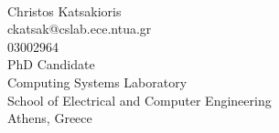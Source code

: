 \begin{titlepage}
		\HRule \\[2cm]

		\vspace{0.5cm}

	 	\Large
		Christos Katsakioris\\
		ckatsak@cslab.ece.ntua.gr\\
		03002964\\
		\vspace{0.25cm}
		\large
		PhD Candidate\\
		Computing Systems Laboratory\\
		School of Electrical and Computer Engineering\\

		\vspace{3.5cm}
		\center Athens, Greece
		\\[2cm]
	\end{titlepage}

    \pagestyle{styletoc}{
        \tableofcontents
    }
    \pagestyle{styleimage}{
	    \listoffigures
	    \newpage
	}

	\pagestyle{styletotal}

	
	
	
	

    \pagestyle{empty}
    \nocite{*}
    
    \renewcommand{\refname}{References}
    

